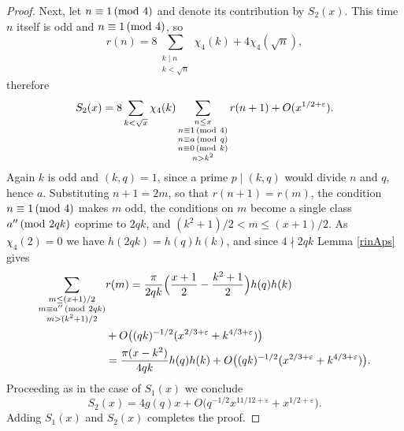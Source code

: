 \documentclass[10pt,a4paper]{amsart}
\renewcommand{\pmod}[1]{\mkern3mu(\mathrm{mod}\ #1)}
\begin{document}
\begin{proof}
    Next, let $n \equiv 1 \pmod 4$ and denote its contribution by $S_2(x)$. This
    time $n$ itself is odd and $n \equiv 1 \pmod 4$, so
    \[
        r(n) = 8\sum_{\substack{k \mid n\\ k < \sqrt{n}}}\chi_4(k) + 4\chi_4(\sqrt{n}),
    \]
    therefore
    \[
        S_2(x) = 8\sum_{k<\sqrt{x}}\chi_4(k)
        \sum_{\substack{n \le x \\ n \equiv 1 \pmod 4\\ n \equiv a \pmod q \\
            n \equiv 0 \pmod k\\ n > k^2}} r(n+1) + O(x^{1/2+\varepsilon}).
    \]
    Again $k$ is odd and $(k,q)=1$, since a prime $p \mid (k,q)$ would divide $n$
    and $q$, hence $a$. Substituting $n+1 = 2m$, so that $r(n+1)=r(m)$, the
    condition $n \equiv 1 \pmod 4$ makes $m$ odd, the conditions on $m$ become a
    single class $a'' \pmod{2qk}$ coprime to $2qk$, and
    $(k^2+1)/2 < m \le (x+1)/2$. As $\chi_4(2)=0$ we have $h(2qk)=h(q)h(k)$, and
    since $4 \nmid 2qk$ Lemma \ref{rinAps} gives
    \[
        \begin{split}
            \sum_{\substack{m \le (x+1)/2 \\ m \equiv a'' \pmod{2qk} \\
                m > (k^2+1)/2}}& r(m)
            = \frac{\pi}{2qk}\Bigl(\frac{x+1}{2}-\frac{k^2+1}{2}\Bigr)h(q)h(k) \\
               &+ O\bigl((qk)^{-1/2}(x^{2/3+\varepsilon}+k^{4/3+\varepsilon})\bigr)\\
            &= \frac{\pi (x-k^2)}{4qk}h(q)h(k)
               + O\bigl((qk)^{-1/2}(x^{2/3+\varepsilon}+k^{4/3+\varepsilon})\bigr).
        \end{split}
    \]
    Proceeding as in the case of $S_1(x)$ we conclude
    \[
        S_2(x) = 4g(q)x + O\bigl(q^{-1/2}x^{11/12+\varepsilon}+x^{1/2+\varepsilon}\bigr).
    \]
    Adding $S_1(x)$ and $S_2(x)$ completes the proof.
\end{proof}
\end{document}
